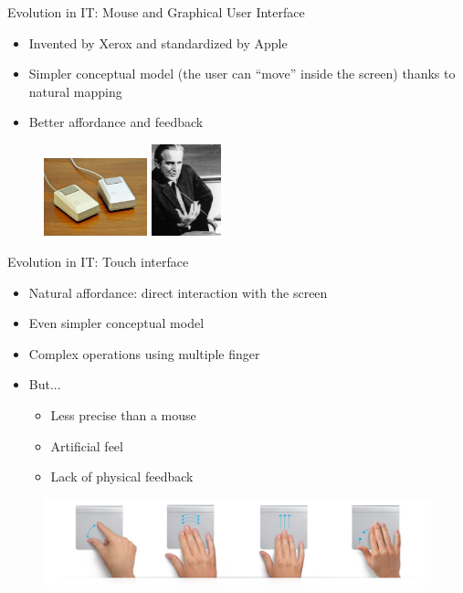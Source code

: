 \documentclass{beamer}
\begin{document}
\begin{frame}{Evolution in IT: Mouse and Graphical User Interface}
\begin{itemize}
\item Invented by Xerox and standardized by Apple
\item Simpler conceptual model (the user can ``move'' inside the screen) thanks to natural mapping
\item Better affordance and feedback
\end{itemize}

\begin{figure}
\raggedleft
	   \begin{minipage}{5cm}
				  \includegraphics[width=3cm]{mice.jpg}
			  \end{minipage}
			  	   \begin{minipage}{5cm}
				  \includegraphics[width=2cm]{doug.jpg}
			  \end{minipage}
\end{figure}
\end{frame}

\begin{frame}{Evolution in IT: Touch interface}
\begin{itemize}
\item Natural affordance: direct interaction with the screen
\item Even simpler conceptual model
\item Complex operations using multiple finger
\item But...
    \begin{itemize}
        \item Less precise than a mouse
        \item Artificial feel
        \item Lack of physical feedback
    \end{itemize}
\end{itemize}
\begin{figure}[ht]
\includegraphics[scale=0.3]{multitouch_gestures_trackpad_2.jpg}
\end{figure}
\end{frame}
\end{document}
